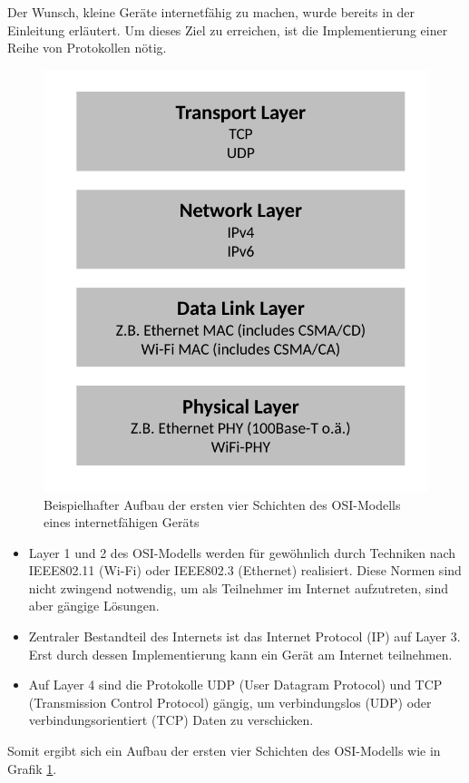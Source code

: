 Der Wunsch, kleine Geräte internetfähig zu machen, wurde bereits in der Einleitung erläutert. Um dieses Ziel zu erreichen, ist die Implementierung einer Reihe von Protokollen nötig.
\begin{figure}
	\centering
	\includegraphics[width=\textwidth/2]{Grafiken-Alex/internet-osi.pdf}
	\caption{Beispielhafter Aufbau der ersten vier Schichten des OSI-Modells eines internetfähigen Geräts}
	\label{internet-osi}
\end{figure}
\begin{itemize}
	\item Layer 1 und 2 des OSI-Modells werden für gewöhnlich durch Techniken nach IEEE802.11 (Wi-Fi) oder IEEE802.3 (Ethernet) realisiert. Diese Normen sind nicht zwingend notwendig, um als Teilnehmer im Internet aufzutreten, sind aber gängige Lösungen.
	\item Zentraler Bestandteil des Internets ist das Internet Protocol (IP) auf Layer 3. Erst durch dessen Implementierung kann ein Gerät am Internet teilnehmen.
	\item Auf Layer 4 sind die Protokolle UDP (User Datagram Protocol) und TCP (Transmission Control Protocol) gängig, um verbindungslos (UDP) oder verbindungsorientiert (TCP) Daten zu verschicken.
\end{itemize}
Somit ergibt sich ein Aufbau der ersten vier Schichten des OSI-Modells wie in Grafik \ref{internet-osi}. 

